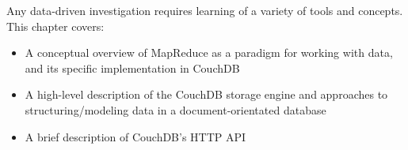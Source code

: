 Any data-driven investigation requires learning of a variety of tools and concepts. This chapter covers:

\begin{itemize}
    \item A conceptual overview of MapReduce as a paradigm for working with data, and its specific implementation in CouchDB
    \item A high-level description of the CouchDB storage engine and approaches to structuring/modeling data in a document-orientated database
    \item A brief description of CouchDB's HTTP API
\end{itemize}